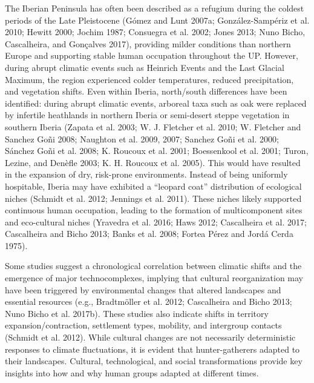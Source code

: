\documentclass[
  a4paper,
  DIV=11,
  numbers=noendperiod]{scrreprt}
\begin{document}
The Iberian Peninsula has often been described as a refugium during the
coldest periods of the Late Pleistocene (Gómez and Lunt 2007a;
González-Sampériz et al. 2010; Hewitt 2000; Jochim 1987; Consuegra et
al. 2002; Jones 2013; Nuno Bicho, Cascalheira, and Gonçalves 2017),
providing milder conditions than northern Europe and supporting stable
human occupation throughout the UP. However, during abrupt climatic
events such as Heinrich Events and the Last Glacial Maximum, the region
experienced colder temperatures, reduced precipitation, and vegetation
shifts. Even within Iberia, north/south differences have been
identified: during abrupt climatic events, arboreal taxa such as oak
were replaced by infertile heathlands in northern Iberia or semi-desert
steppe vegetation in southern Iberia (Zapata et al. 2003; W. J. Fletcher
et al. 2010; W. Fletcher and Sanchez Goñi 2008; Naughton et al. 2009,
2007; Sanchez Goñi et al. 2000; Sánchez Goñi et al. 2008; K. Roucoux et
al. 2001; Boessenkool et al. 2001; Turon, Lezine, and Denèfle 2003; K.
H. Roucoux et al. 2005). This would have resulted in the expansion of
dry, risk-prone environments. Instead of being uniformly hospitable,
Iberia may have exhibited a ``leopard coat'' distribution of ecological
niches (Schmidt et al. 2012; Jennings et al. 2011). These niches likely
supported continuous human occupation, leading to the formation of
multicomponent sites and eco-cultural niches (Yravedra et al. 2016; Haws
2012; Cascalheira et al. 2017; Cascalheira and Bicho 2013; Banks et al.
2008; Fortea Pérez and Jordá Cerda 1975).

Some studies suggest a chronological correlation between climatic shifts
and the emergence of major technocomplexes, implying that cultural
reorganization may have been triggered by environmental changes that
altered landscapes and essential resources (e.g., Bradtmöller et al.
2012; Cascalheira and Bicho 2013; Nuno Bicho et al. 2017b). These
studies also indicate shifts in territory expansion/contraction,
settlement types, mobility, and intergroup contacts (Schmidt et al.
2012). While cultural changes are not necessarily deterministic
responses to climate fluctuations, it is evident that hunter-gatherers
adapted to their landscapes. Cultural, technological, and social
transformations provide key insights into how and why human groups
adapted at different times.
\end{document}
